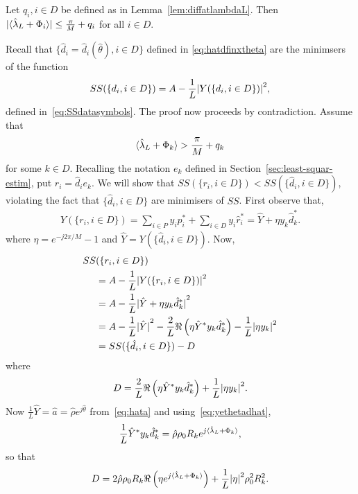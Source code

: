 \documentclass[journal]{IEEEtran}
\begin{document}
\begin{lemma}\label{lem:fracpartlambdahatnotpi} Let $q_i, i \in D$ be defined as in Lemma~\ref{lem:diffatlambdaL}.  Then ${\vert \langle \hat{\lambda}_L + \Phi_i \rangle \vert} \leq \frac{\pi}{M} + q_i$ for all $i \in D$.
\end{lemma}
\begin{IEEEproof}
Recall that $\{\hat{d}_i = \hat{d}_i(\hat{\theta}), i \in D\}$ defined in \eqref{eq:hatdfinxtheta} are the minimsers of the function 
\[
SS(\{d_i, i \in D\}) = A - \frac{1}{L}{\vert Y(\{d_i, i \in D\}) \vert}^2,
\]
defined in~\eqref{eq:SSdatasymbols}. The proof now proceeds by contradiction.  Assume that 
\begin{equation}\label{eq:fraclambassumption}
\langle \hat{\lambda}_L + \Phi_k \rangle > \frac{\pi}{M} + q_k
\end{equation}
for some $k \in D$.  Recalling the notation $e_k$ defined in Section~\ref{sec:least-squar-estim}, put $r_i = \hat{d}_i e_k$.  We will show that $SS(\{r_i, i \in D\}) < SS(\{\hat{d}_i, i \in D\})$, violating the fact that $\{\hat{d}_i, i \in D\}$ are minimisers of $SS$.  First observe that,
\begin{align*}
Y(\{ r_i, i \in D\}) = \sum_{i \in P} y_ip_i^* + \sum_{i \in D} y_i\hat{r}_i^* = \hat{Y} + \eta y_k\hat{d}_k^*.
\end{align*}
where $\eta = e^{-j2\pi/M} - 1$ and $\hat{Y} = Y(\{ \hat{d}_i, i \in D\})$.  Now,
\begin{align*}
SS&(\{r_i, i \in D\}) \\
&= A - \frac{1}{L} {\vert  Y(\{ r_i, i \in D\})  \vert}^2 \\
&= A - \frac{1}{L} {\vert  \hat{Y} + \eta y_k\hat{d}_k^*  \vert}^2 \\
&= A - \frac{1}{L}{\vert \hat{Y} \vert}^2 - \frac{2}{L}\Re\left(\eta \hat{Y}^* y_k \hat{d}_k^* \right) -  \frac{1}{L}{\vert  \eta y_k \vert}^2\\
&= SS(\{\hat{d}_i, i \in D\}) - D
\end{align*}
where 
\[
D = \frac{2}{L}\Re\left(\eta \hat{Y}^* y_k \hat{d}_k^* \right) +  \frac{1}{L}{\vert  \eta y_k  \vert}^2.
\]
Now $\frac{1}{L}\hat{Y} = \hat{a} = \hat{\rho} e^{j\hat{\theta}}$ from~\eqref{eq:hata} and using~\eqref{eq:yethetadhat},
\[
\frac{1}{L} \hat{Y}^* y_k \hat{d}_k^* = \hat{\rho} \rho_0 R_k e^{j\langle \hat{\lambda}_L + \Phi_k \rangle},
\]
so that
\begin{equation}\label{eq:Ddefn}
D = 2 \hat{\rho} \rho_0 R_k \Re\left( \eta e^{j\langle \hat{\lambda}_L + \Phi_k \rangle}\right) + \frac{1}{L}{\vert \eta \vert}^2\rho_0^2 R_k^2.
\end{equation}

\end{IEEEproof}
\end{document}
